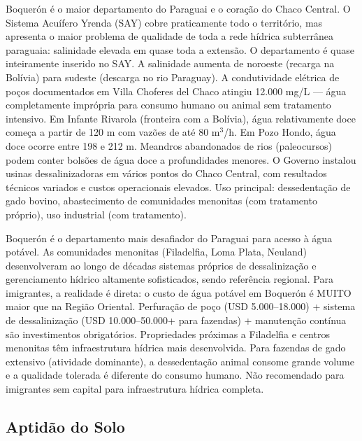 Boquerón é o maior departamento do Paraguai e o coração do Chaco Central. O Sistema Acuífero Yrenda (SAY) cobre praticamente todo o território, mas apresenta o maior problema de qualidade de toda a rede hídrica subterrânea paraguaia: salinidade elevada em quase toda a extensão. O departamento é quase inteiramente inserido no SAY. A salinidade aumenta de noroeste (recarga na Bolívia) para sudeste (descarga no rio Paraguay). A condutividade elétrica de poços documentados em Villa Choferes del Chaco atingiu 12.000 mg/L --- água completamente imprópria para consumo humano ou animal sem tratamento intensivo. Em Infante Rivarola (fronteira com a Bolívia), água relativamente doce começa a partir de 120 m com vazões de até 80 m$^3$/h. Em Pozo Hondo, água doce ocorre entre 198 e 212 m. Meandros abandonados de rios (paleocursos) podem conter bolsões de água doce a profundidades menores. O Governo instalou usinas dessalinizadoras em vários pontos do Chaco Central, com resultados técnicos variados e custos operacionais elevados. Uso principal: dessedentação de gado bovino, abastecimento de comunidades menonitas (com tratamento próprio), uso industrial (com tratamento).


Boquerón é o departamento mais desafiador do Paraguai para acesso à água potável. As comunidades menonitas (Filadelfia, Loma Plata, Neuland) desenvolveram ao longo de décadas sistemas próprios de dessalinização e gerenciamento hídrico altamente sofisticados, sendo referência regional. Para imigrantes, a realidade é direta: o custo de água potável em Boquerón é MUITO maior que na Região Oriental. Perfuração de poço (USD 5.000--18.000) + sistema de dessalinização (USD 10.000--50.000+ para fazendas) + manutenção contínua são investimentos obrigatórios. Propriedades próximas a Filadelfia e centros menonitas têm infraestrutura hídrica mais desenvolvida. Para fazendas de gado extensivo (atividade dominante), a dessedentação animal consome grande volume e a qualidade tolerada é diferente do consumo humano. Não recomendado para imigrantes sem capital para infraestrutura hídrica completa.




\subsection{Aptidão do Solo}



